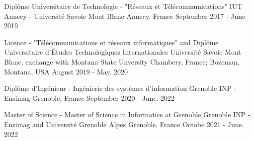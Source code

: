 

\begin{cventries}

  \cventry
    {Diplôme Universitaire de Technologie - "Réseaux et Télécommunications"} %
    {IUT Annecy - Université Savoie Mont Blanc} %
    {Annecy, France} %
    {September 2017 - June 2019} %
    {
    }

    \cventry
    {Licence - "Télécommunications et réseaux informatiques" and Diplôme Universitaire d'Études Technologiques Internationales} %
    {Université Savoie Mont Blanc, exchange with Montana State Unversity} %
    {Chambery, France; Bozeman, Montana, USA} %
    {August 2019 - May. 2020} %
    {
    }
    
    \cventry
    {Diplôme d'Ingénieur - Ingénierie des systèmes d'information} %
    {Grenoble INP - Ensimag} %
    {Grenoble, France} %
    {September 2020 - June. 2022} %
    {
    }
    
    \cventry
    {Master of Science - Master of Science in Informatics at Grenoble} %
    {Grenoble INP - Ensimag and Université Grenoble Alpes} %
    {Grenoble, France} %
    {Octobe 2021 - June. 2022} %
    {
    }
\end{cventries}
